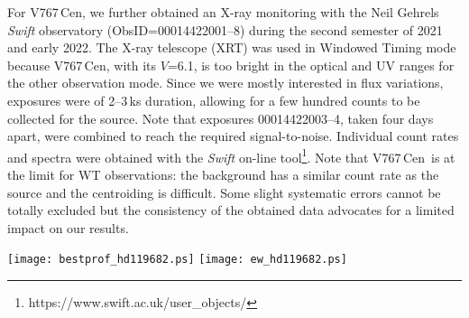 \documentclass[a4paper,fleqn,usenatbib]{mnras}
\newcommand{\xmm}{{\sc{XMM}}\emph{-Newton}}
\newcommand{\hd}{HD\,119682}
\newcommand{\vc}{V767\,Cen}
\newcommand{\kms}{km\,s$^{-1}$}
\begin{document}
For \vc, we further obtained an X-ray monitoring with the Neil Gehrels {\it Swift} observatory (ObsID=00014422001--8) during the second semester of 2021 and early 2022. The X-ray telescope (XRT) was used in Windowed Timing mode because \vc, with its $V$=6.1, is too bright in the optical and UV ranges for the other observation mode. Since we were mostly interested in flux variations, exposures were of 2--3\,ks duration, allowing for a few hundred counts to be collected for the source. Note that exposures 00014422003--4, taken four days apart, were combined to reach the required signal-to-noise. Individual count rates and spectra were obtained with the {\it Swift} on-line tool\footnote{https://www.swift.ac.uk/user\_objects/}. Note that \vc\ is at the limit for WT observations: the background has a similar count rate as the source and the centroiding is difficult. Some slight systematic errors cannot be totally excluded but the consistency of the obtained data advocates for a limited impact on our results.

\begin{figure*}
  \begin{center}
    \texttt{[image: bestprof\_hd119682.ps]}
    \texttt{[image: ew\_hd119682.ps]}
  \end{center}
  \caption{{\it Left panels:} Evolution with time of the profile of the H$\alpha$ line observed in \hd\ during our monitoring campaign. Dates in YYMMDD are provided to the right of the line. Spectra taken close to the time of an \xmm\ observation are shown with a magenta dotted line, while vertical black dotted lines indicate the interval chosen for equivalent width determination. Note that the noisier ($SNR<20$) or lower-resolution($R<3000$) spectra are not shown. {\it Right panel:} Evolution with time of the H$\alpha$ equivalent widths measured in the --600 to +600\,\kms\ interval and of X-ray fluxes. The top axis provides the date in years while the bottom axis uses julian dates. Red open triangles display the values obtained from the noisier spectra ($SNR<20$), black open squares those measured on the lower resolution data ($R<3000$ but $SNR>20$), green dots those derived from other amateur spectra ($R>3000$ and $SNR>20$), and blue symbols those measured on ESO spectra (stars for UVES and open pentagon for X-Shooter). Note the very good agreement between ESO and amateur data taken at similar dates. The vertical magenta dotted lines indicate the times of the \xmm\ observations. }
\label{profhd}
\end{figure*}
\end{document}
